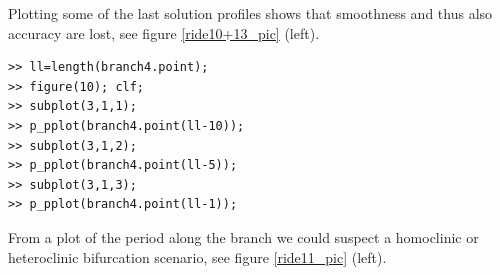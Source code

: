 \documentclass[10pt]{article}
\begin{document}
{Plotting some of the last solution profiles shows that smoothness
and thus also accuracy are lost, see figure \ref{ride10+13_pic} (left).
{\small\begin{verbatim}
>> ll=length(branch4.point);
>> figure(10); clf;
>> subplot(3,1,1);
>> p_pplot(branch4.point(ll-10));
>> subplot(3,1,2);
>> p_pplot(branch4.point(ll-5));
>> subplot(3,1,3);
>> p_pplot(branch4.point(ll-1));
\end{verbatim}}
From a plot of the period along the branch we could suspect a homoclinic
or heteroclinic bifurcation scenario, see figure \ref{ride11_pic} (left).
\begin{figure}[h]
\begin{center}

\end{center}
\end{figure}}
\end{document}
